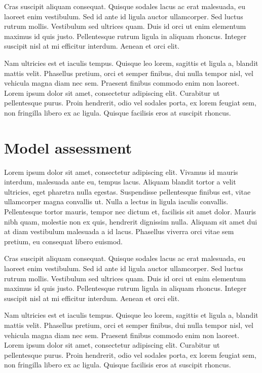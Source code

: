 \documentclass[a4paper, nobind]{templates/ociamthesis}
\theoremstyle{definition}
\theoremstyle{definition}
\theoremstyle{definition}
\theoremstyle{remark}
\begin{document}
Cras suscipit aliquam consequat. Quisque sodales lacus ac erat malesuada, eu laoreet enim vestibulum. Sed id ante id ligula auctor ullamcorper. Sed luctus rutrum mollis. Vestibulum sed ultrices quam. Duis id orci ut enim elementum maximus id quis justo. Pellentesque rutrum ligula in aliquam rhoncus. Integer suscipit nisl at mi efficitur interdum. Aenean et orci elit.

Nam ultricies est et iaculis tempus. Quisque leo lorem, sagittis et ligula a, blandit mattis velit. Phasellus pretium, orci et semper finibus, dui nulla tempor nisl, vel vehicula magna diam nec sem. Praesent finibus commodo enim non laoreet. Lorem ipsum dolor sit amet, consectetur adipiscing elit. Curabitur ut pellentesque purus. Proin hendrerit, odio vel sodales porta, ex lorem feugiat sem, non fringilla libero ex ac ligula. Quisque facilisis eros at suscipit rhoncus.

\hypertarget{model-assessment}{%
\section{Model assessment}\label{model-assessment}}

Lorem ipsum dolor sit amet, consectetur adipiscing elit. Vivamus id mauris interdum, malesuada ante eu, tempus lacus. Aliquam blandit tortor a velit ultricies, eget pharetra nulla egestas. Suspendisse pellentesque finibus est, vitae ullamcorper magna convallis ut. Nulla a lectus in ligula iaculis convallis. Pellentesque tortor mauris, tempor nec dictum et, facilisis sit amet dolor. Mauris nibh quam, molestie non ex quis, hendrerit dignissim nulla. Aliquam sit amet dui at diam vestibulum malesuada a id lacus. Phasellus viverra orci vitae sem pretium, eu consequat libero euismod.

Cras suscipit aliquam consequat. Quisque sodales lacus ac erat malesuada, eu laoreet enim vestibulum. Sed id ante id ligula auctor ullamcorper. Sed luctus rutrum mollis. Vestibulum sed ultrices quam. Duis id orci ut enim elementum maximus id quis justo. Pellentesque rutrum ligula in aliquam rhoncus. Integer suscipit nisl at mi efficitur interdum. Aenean et orci elit.

Nam ultricies est et iaculis tempus. Quisque leo lorem, sagittis et ligula a, blandit mattis velit. Phasellus pretium, orci et semper finibus, dui nulla tempor nisl, vel vehicula magna diam nec sem. Praesent finibus commodo enim non laoreet. Lorem ipsum dolor sit amet, consectetur adipiscing elit. Curabitur ut pellentesque purus. Proin hendrerit, odio vel sodales porta, ex lorem feugiat sem, non fringilla libero ex ac ligula. Quisque facilisis eros at suscipit rhoncus.
\end{document}
